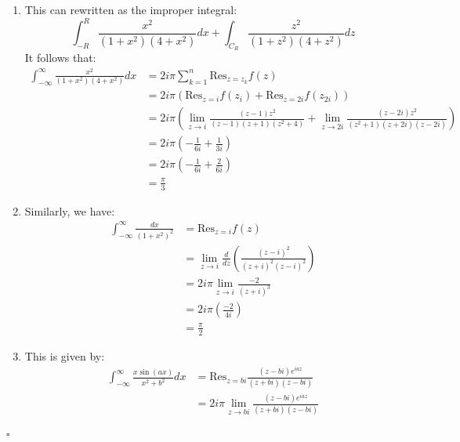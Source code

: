 \documentclass[11pt]{article}
\newenvironment{proof}{\noindent{\bf Proof.}}{\hfill $\square$\medskip}
\begin{document}
\begin{proof}
    \begin{enumerate}[label=\textbf{(\alph*)}]
        \item This can rewritten as the improper integral:
        $$\int_{-R}^{R}\frac{x^{2}}{(1+x^{2})(4+x^{2})}dx+\int_{C_{R}}\frac{z^{2}}{(1+z^{2})(4+z^{2})}dz$$
        It follows that:
        \begin{equation}
            \begin{split}
                \int_{-\infty}^{\infty}\frac{x^{2}}{(1+x^{2})(4+x^{2})}dx&=2i\pi\sum_{k=1}^{n}\text{Res}_{z=z_{k}}f(z)\\
                &=2i\pi(\text{Res}_{z=i}f(z_{i})+\text{Res}_{z=2i}f(z_{2i}))\\
                &=2i\pi(\lim_{z\to i}\frac{(z-1)z^{2}}{(z-1)(z+1)(z^{2}+4)}+\lim_{z\to2i}\frac{(z-2i)z^{2}}{(z^{2}+1)(z+2i)(z-2i)})\\
                &=2i\pi(-\frac{1}{6i}+\frac{1}{3i})\\
                &=2i\pi(-\frac{1}{6i}+\frac{2}{6i})\\
                &=\frac{\pi}{3}
            \end{split}
        \end{equation}
        \item Similarly, we have:
        \begin{equation}
            \begin{split}
                \int_{-\infty}^{\infty}\frac{dx}{(1+x^{2})^{2}}&=\text{Res}_{z=i}f(z)\\
                &=\lim_{z\to i}\frac{d}{dz}\left(\frac{(z-i)^{2}}{(z+i)^{2}(z-i)^{2}}\right)\\
                &=2i\pi\lim_{z\to i}\frac{-2}{(z+i)^{3}}\\
                &=2i\pi\left(\frac{-2}{4i}\right)\\
                &=\frac{\pi}{2}
            \end{split}
        \end{equation}
        \item This is given by:
        \begin{equation}
            \begin{split}
                \int_{-\infty}^{\infty}\frac{x\sin(ax)}{x^{2}+b^{2}}dx&=\text{Res}_{z=bi}\frac{(z-bi)e^{iaz}}{(z+bi)(z-bi)}\\
                &=2i\pi\lim_{z\to bi}\frac{(z-bi)e^{iaz}}{(z+bi)(z-bi)}\\

\end{split}
\end{equation}
\end{enumerate}
\end{proof}
\end{document}
